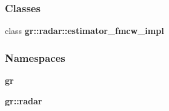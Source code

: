 \subsubsection*{Classes}
\begin{DoxyCompactItemize}
\item 
class {\bf gr\+::radar\+::estimator\+\_\+fmcw\+\_\+impl}
\end{DoxyCompactItemize}
\subsubsection*{Namespaces}
\begin{DoxyCompactItemize}
\item 
 {\bf gr}
\item 
 {\bf gr\+::radar}
\end{DoxyCompactItemize}
